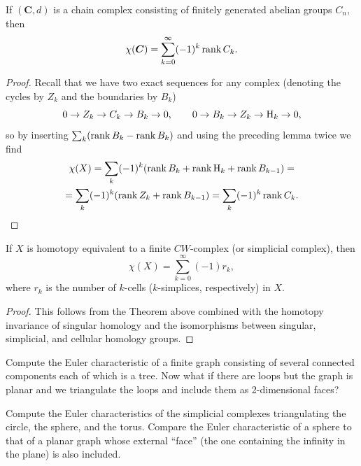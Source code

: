 \begin{thm}
    If $(\bm{C},d)$ is a chain complex consisting of finitely generated abelian groups $C_n$, then
    \[\chi(\boldsymbol{C})=\sum_{k=0}^\infty (-1)^k\operatorname{rank} C_k.\]
\end{thm}
\begin{proof}
    Recall that we have two exact sequences for any complex (denoting the cycles by $Z_k$ and the boundaries by $B_k$)
    \[0\to Z_k\to C_k\to B_k\to 0,\quad\quad 0\to B_k\to Z_k\to \mathrm{H}_k\to 0,\]
    so by inserting $\sum_k (\operatorname{rank} B_k-\operatorname{rank} B_k)$ and using the preceding lemma twice we find
    \begin{multline}
        \chi(X)=\sum_k(-1)^k(\operatorname{rank} B_k+\operatorname{rank} \mathrm{H}_k+\operatorname{rank} B_{k-1})=\\
        =\sum_k(-1)^k(\operatorname{rank} Z_k+\operatorname{rank} B_{k-1})=\sum_k (-1)^k\operatorname{rank} C_k.
    \end{multline}
\end{proof}
\begin{cor}
    If $X$ is homotopy equivalent to a finite $CW$-complex (or simplicial complex), then
    \[\chi(X)=\sum_{k=0}^\infty (-1)r_k,\]
    where $r_k$ is the number of $k$-cells ($k$-simplices, respectively) in $X$.
\end{cor}
\begin{proof}
    This follows from the Theorem above combined with the homotopy invariance of singular homology and the isomorphisms between singular, simplicial, and cellular homology groups.
\end{proof}


\begin{xca}
    Compute the Euler characteristic of a finite graph consisting of several connected components each of which is a tree. Now what if there are loops but the graph is planar and we triangulate the loops and include them as 2-dimensional faces?
\end{xca}

\begin{xca}
    Compute the Euler characteristics of the simplicial complexes triangulating the circle, the sphere, and the torus. Compare the Euler characteristic of a sphere to that of a planar graph whose external ``face'' (the one containing the infinity in the plane) is also included.
\end{xca}



